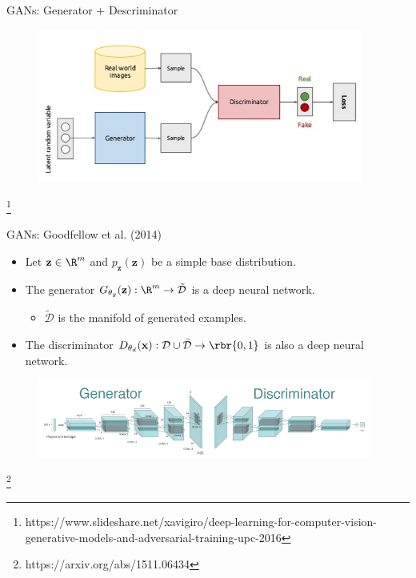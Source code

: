 \documentclass[notheorems]{beamer}
\newcommand{\source}[1]{{\let\thefootnote\relax\footnote{{\tiny #1}}}}
\newcommand{\xx}{\mathbf{x}}
\newcommand{\zz}{\mathbf{z}}
\newcommand{\vtheta}{\mathbf{\theta}}
\begin{document}
    \begin{frame}{GANs: Generator + Descriminator}

        \begin{figure}
            \centering
            \includegraphics[width=0.95\textwidth]{figures/gan_conceptual}
        \end{figure}

        \source{https://www.slideshare.net/xavigiro/deep-learning-for-computer-vision-generative-models-and-adversarial-training-upc-2016}

    \end{frame}

    \begin{frame}{GANs: Goodfellow et al. (2014)}

        \begin{itemize}
            \item Let $\zz \in \R^{m}$ and $p_{\zz}(\zz)$ be a simple base distribution.
            \item The generator $G_{\vtheta_g}(\zz): \R^m \rightarrow \mathcal{\tilde D}$ is a deep neural network.
            \begin{itemize}
                \item $\mathcal{\tilde D}$ is the manifold of generated examples.
            \end{itemize}
            \item The discriminator $D_{\vtheta_d}(\xx): \mathcal{D} \cup \mathcal{\tilde D} \rightarrow \rbr{0,1}$ is also a deep neural network.
        \end{itemize}
        \vspace{0.4cm}

        \begin{figure}
            \centering
            \includegraphics[width=0.98\textwidth]{figures/conv_gan}
        \end{figure}

        \source{https://arxiv.org/abs/1511.06434}

    \end{frame}
\end{document}
